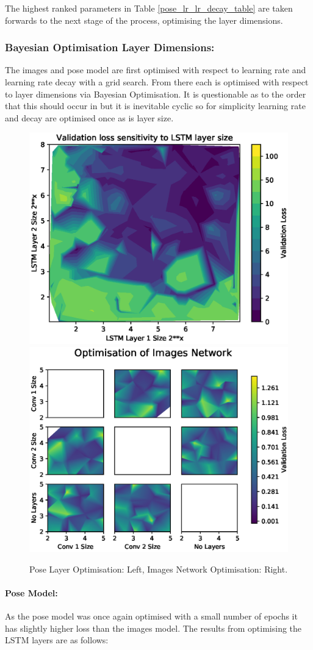 \documentclass[11pt,twoside]{report}
\begin{document}
The highest ranked parameters in Table \ref{pose_lr_lr_decay_table} are taken forwards to the next stage of the process, optimising the layer dimensions.
 
\subsubsection{Bayesian Optimisation Layer Dimensions:}
The images and pose model are first optimised with respect to learning rate and learning rate decay with a grid search. From there each is optimised with respect to layer dimensions via Bayesian Optimisation. It is questionable as to the order that this should occur in but it is inevitable cyclic so for simplicity learning rate and decay are optimised once as is layer size.



\noindent \begin{figure}[h!]
	\includegraphics[width = 0.5\hsize]{figures/pose_lstm1_lstm2_graph_.eps}
	\includegraphics[width = 0.5\hsize]{figures/opt_bayes_images_nn.eps}
	\caption{Pose Layer Optimisation: Left, Images Network Optimisation: Right.}
	\label{bayes_opt_fig}
\end{figure}

\paragraph{Pose Model:} As the pose model was once again optimised with a small number of epochs it has slightly higher loss than the images model. The results from optimising the LSTM layers are as follows:
\end{document}
